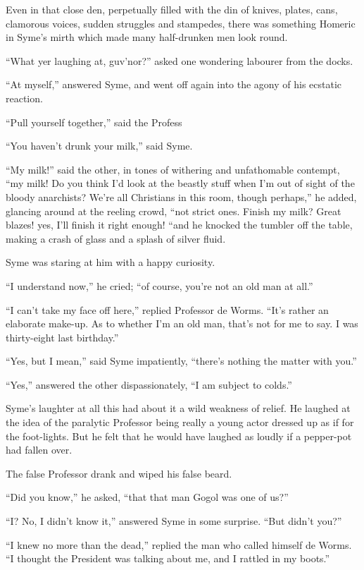 \documentclass{book}
\begin{document}
Even in that close den, perpetually filled with the din of knives, plates, cans, clamorous voices, sudden struggles and stampedes, there was something Homeric in Syme’s mirth which made many half-drunken men look round.

“What yer laughing at, guv’nor?” asked one wondering labourer from the docks.

“At myself,” answered Syme, and went off again into the agony of his ecstatic reaction.

“Pull yourself together,” said the Profess

“You haven’t drunk your milk,” said Syme.

“My milk!” said the other, in tones of withering and unfathomable contempt, “my milk! Do you think I’d look at the beastly stuff when I’m out of sight of the bloody anarchists? We’re all Christians in this room, though perhaps,” he added, glancing around at the reeling crowd, “not strict ones. Finish my milk? Great blazes! yes, I’ll finish it right enough! “and he knocked the tumbler off the table, making a crash of glass and a splash of silver fluid.

Syme was staring at him with a happy curiosity.

“I understand now,” he cried; “of course, you’re not an old man at all.”

“I can’t take my face off here,” replied Professor de Worms. “It’s rather an elaborate make-up. As to whether I’m an old man, that’s not for me to say. I was thirty-eight last birthday.”

“Yes, but I mean,” said Syme impatiently, “there’s nothing the matter with you.”

“Yes,” answered the other dispassionately, “I am subject to colds.”

Syme’s laughter at all this had about it a wild weakness of relief. He laughed at the idea of the paralytic Professor being really a young actor dressed up as if for the foot-lights. But he felt that he would have laughed as loudly if a pepper-pot had fallen over.

The false Professor drank and wiped his false beard.

“Did you know,” he asked, “that that man Gogol was one of us?”

“I? No, I didn’t know it,” answered Syme in some surprise. “But didn’t you?”

“I knew no more than the dead,” replied the man who called himself de Worms. “I thought the President was talking about me, and I rattled in my boots.”
\end{document}
